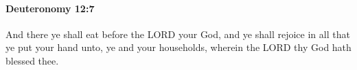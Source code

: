 
		\paragraph{Deuteronomy 12:7} %
			\label{DEUTERONOMY-12-7}

			And there ye shall eat before the LORD your God, and ye shall rejoice in all that ye put your hand unto, ye and your households, wherein the LORD thy God hath blessed thee.


